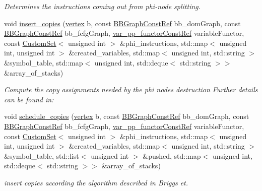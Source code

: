 \begin{DoxyCompactItemize}
\begin{DoxyCompactList}\small\item\em Determines the instructions coming out from phi-\/node splitting. \end{DoxyCompactList}\item 
void \hyperlink{classCWriter_ad9cb6bbf514295637f24b12e35af9939}{insert\+\_\+copies} (\hyperlink{graph_8hpp_abefdcf0544e601805af44eca032cca14}{vertex} b, const \hyperlink{basic__block_8hpp_ab66bdbde3a29e41d079d8a320af9c921}{B\+B\+Graph\+Const\+Ref} bb\+\_\+dom\+Graph, const \hyperlink{basic__block_8hpp_ab66bdbde3a29e41d079d8a320af9c921}{B\+B\+Graph\+Const\+Ref} bb\+\_\+fcfg\+Graph, \hyperlink{var__pp__functor_8hpp_a8a6b51b6519401d911398943510557f0}{var\+\_\+pp\+\_\+functor\+Const\+Ref} variable\+Functor, const \hyperlink{custom__set_8hpp_a615bc2f42fc38a4bb1790d12c759e86f}{Custom\+Set}$<$ unsigned int $>$ \&phi\+\_\+instructions, std\+::map$<$ unsigned int, unsigned int $>$ \&created\+\_\+variables, std\+::map$<$ unsigned int, std\+::string $>$ \&symbol\+\_\+table, std\+::map$<$ unsigned int, std\+::deque$<$ std\+::string $>$$>$ \&array\+\_\+of\+\_\+stacks)
\begin{DoxyCompactList}\small\item\em Compute the copy assignments needed by the phi nodes destruction Further details can be found in\+: \end{DoxyCompactList}\item 
void \hyperlink{classCWriter_acb226fc206697e5e5a8b5e85bbd1b689}{schedule\+\_\+copies} (\hyperlink{graph_8hpp_abefdcf0544e601805af44eca032cca14}{vertex} b, const \hyperlink{basic__block_8hpp_ab66bdbde3a29e41d079d8a320af9c921}{B\+B\+Graph\+Const\+Ref} bb\+\_\+dom\+Graph, const \hyperlink{basic__block_8hpp_ab66bdbde3a29e41d079d8a320af9c921}{B\+B\+Graph\+Const\+Ref} bb\+\_\+fcfg\+Graph, \hyperlink{var__pp__functor_8hpp_a8a6b51b6519401d911398943510557f0}{var\+\_\+pp\+\_\+functor\+Const\+Ref} variable\+Functor, const \hyperlink{custom__set_8hpp_a615bc2f42fc38a4bb1790d12c759e86f}{Custom\+Set}$<$ unsigned int $>$ \&phi\+\_\+instructions, std\+::map$<$ unsigned int, unsigned int $>$ \&created\+\_\+variables, std\+::map$<$ unsigned int, std\+::string $>$ \&symbol\+\_\+table, std\+::list$<$ unsigned int $>$ \&pushed, std\+::map$<$ unsigned int, std\+::deque$<$ std\+::string $>$$>$ \&array\+\_\+of\+\_\+stacks)
\begin{DoxyCompactList}\small\item\em insert copies according the algorithm described in Briggs et. \end{DoxyCompactList}\item 

\end{DoxyCompactItemize}
